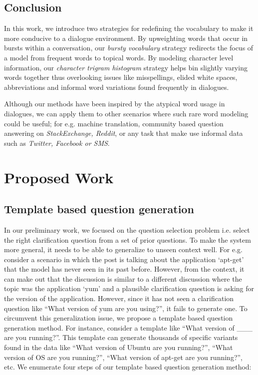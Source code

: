\documentclass[11pt]{report}
\begin{document}
\section{Conclusion}

In this work, we introduce two strategies for redefining the vocabulary to make it more conducive to a dialogue environment. By upweighting words that occur in bursts within a conversation, our \textit{bursty vocabulary} strategy redirects the focus of a model from frequent words to topical words. By modeling character level information, our \textit{character trigram histogram} strategy helps bin slightly varying words together thus overlooking issues like misspellings, elided white spaces, abbreviations and informal word variations found frequently in dialogues. 

Although our methods have been inspired by the atypical word usage in dialogues, we can apply them to other scenarios where such rare word modeling could be useful; for e.g. machine translation, community based question answering on \textit{StackExchange, Reddit}, or any task that make use informal data such as \textit{Twitter, Facebook or SMS}.

\newpage

\chapter{Proposed Work}\label{proposed_work}

\section{Template based question generation}

In our preliminary work, we focused on the question selection problem i.e. select the right clarification question from a set of prior questions. To make the system more general, it needs to be able to generalize to unseen context well. For e.g. consider a scenario in which the post is talking about the application `apt-get' that the model has never seen in its past before. However, from the context, it can make out that the discussion is similar to a different discussion where the topic was the application `yum' and a plausible clarification question is asking for the version of the application. However, since it has not seen a clarification question like ``What version of yum are you using?'', it fails to generate one. To circumvent this generalization issue, we propose a template based question generation method. For instance, consider a template like ``What version of \_\_\_  are you running?''. This template can generate thousands of specific variants found in the data like ``What version of Ubuntu are you running?'', ``What version of OS are you running?'', ``What version of apt-get are you running?'', etc. We enumerate four steps of our template based question generation method:
\end{document}
